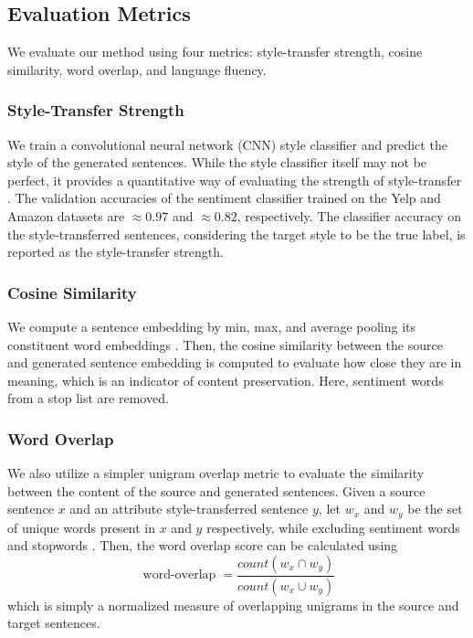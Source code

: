 \documentclass[letterpaper]{article} %
\begin{document}
\subsection{Evaluation Metrics}

We evaluate our method using four metrics: style-transfer strength, cosine similarity, word overlap, and language fluency.

\subsubsection{Style-Transfer Strength}
We train a convolutional neural network (CNN) style classifier \cite{kim2014convolutional} and predict the style of the generated sentences.
While the style classifier itself may not be perfect, it provides a quantitative way of evaluating the strength of style-transfer \cite{hu2017toward,shen2017style,fu2018style}.
The validation accuracies of the sentiment classifier trained on the Yelp and Amazon datasets are $\approx 0.97$ and $\approx 0.82$, respectively.
The classifier accuracy on the style-transferred sentences, considering the target style to be the true label, is reported as the style-transfer strength.

\subsubsection{Cosine Similarity}
We compute a sentence embedding by min, max, and average pooling its constituent word embeddings \cite{fu2018style}.
Then, the cosine similarity between the source and generated sentence embedding is computed to evaluate how close they are in meaning, which is an indicator of content preservation.
Here, sentiment words from a stop list \cite{hu2004mining} are removed.

\subsubsection{Word Overlap}
We also utilize a simpler unigram overlap metric to evaluate the similarity between the content of the source and generated sentences.
Given a source sentence $x$ and an attribute style-transferred sentence $y$, let $w_x$ and $w_y$ be the set of unique words present in $x$ and $y$ respectively, while excluding sentiment words \cite{hu2004mining} and stopwords \cite{bird2004nltk}.
Then, the word overlap score can be calculated using $$\operatorname{word-overlap} = \frac{count(w_x \cap w_y)}{count(w_x \cup w_y)}$$ which is simply a normalized measure of overlapping unigrams in the source and target sentences.
\end{document}
